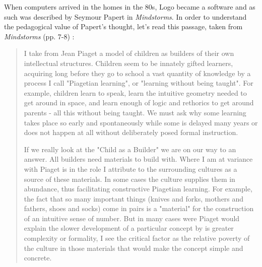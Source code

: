 When computers arrived in the homes in the 80s, Logo became a software and as such was described by Seymour Papert in  \textit{Mindstorms}. In order to understand the pedagogical value of Papert's thought, let's read this passage, taken from  \textit{Mindstorms} (pp. 7-8) \cite{Papert}:

\begin{quote} 
I take from Jean Piaget a model of children as builders of their own intellectual structures. Children seem to be innately gifted learners, acquiring long before they go to school a vast quantity of knowledge by a process I call "Piagetian learning", or "learning without being taught". For example, children learn to speak, learn the intuitive geometry needed to get around in space, and learn enough of logic and rethorics to get around parents - all this without being taught. We must ask why some learning takes place so early and spontaneously while some is delayed many years or does not happen at all without deliberately posed formal instruction. 

If we really look at the "Child as a Builder" we are on our way to an answer. All builders need materials to build with. Where I am at variance with Piaget is in the role I attribute to the surrounding cultures as a source of these materials. In some cases the culture supplies them in abundance, thus facilitating constructive Piagetian learning. For example, the fact that so many important things (knives and forks, mothers and fathers, shoes and socks) come in pairs is a "material" for the construction of an intuitive sense of number. But in many cases were Piaget would explain the slower development of a particular concept by is greater complexity or formality, I see the critical factor as the relative poverty of the culture in those materials that would make the concept simple and concrete.
\end{quote}


